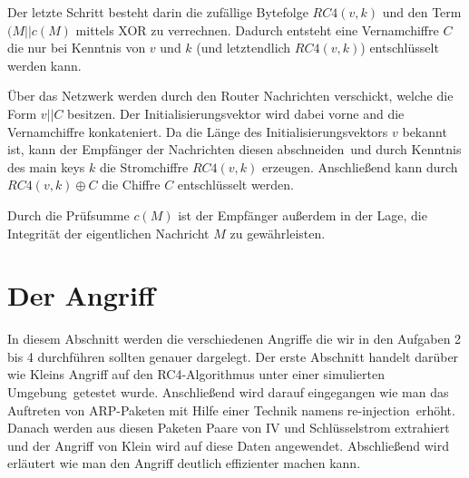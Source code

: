 \documentclass[10pt,a4paper]{article}
\begin{document}
Der letzte Schritt besteht darin die zufällige Bytefolge $RC4(v,k)$ und den Term $(M || c(M)$ mittels XOR zu verrechnen. Dadurch entsteht eine Vernamchiffre $C$ die nur bei Kenntnis von $v$ und $k$ (und letztendlich $RC4(v,k)$) entschlüsselt werden kann.

Über das Netzwerk werden durch den Router Nachrichten verschickt, welche die Form $v || C$ besitzen. Der Initialisierungsvektor wird dabei vorne and die Vernamchiffre konkateniert. Da die Länge des Initialisierungsvektors $v$ bekannt ist, kann der Empfänger der Nachrichten diesen \glqq abschneiden\grqq\ und durch Kenntnis des main keys $k$ die Stromchiffre $RC4(v,k)$ erzeugen. Anschließend kann durch $RC4(v,k) \oplus C$ die Chiffre $C$ entschlüsselt werden.

Durch die Prüfsumme $c(M)$ ist der Empfänger außerdem in der Lage, die Integrität der eigentlichen Nachricht $M$ zu gewährleisten. 

\section{Der Angriff}
In diesem Abschnitt werden die verschiedenen Angriffe die wir in den Aufgaben 2 bis 4 durchführen sollten genauer dargelegt. Der erste Abschnitt handelt darüber wie Kleins Angriff auf den RC4-Algorithmus unter einer \glqq simulierten Umgebung\grqq \ getestet wurde. Anschließend wird darauf eingegangen wie man das Auftreten von ARP-Paketen  mit Hilfe einer Technik namens \glqq re-injection\grqq \ erhöht. Danach werden aus diesen Paketen Paare von IV und Schlüsselstrom extrahiert und der Angriff von Klein wird auf diese Daten angewendet. Abschließend wird erläutert wie man den Angriff deutlich effizienter machen kann.
\end{document}
